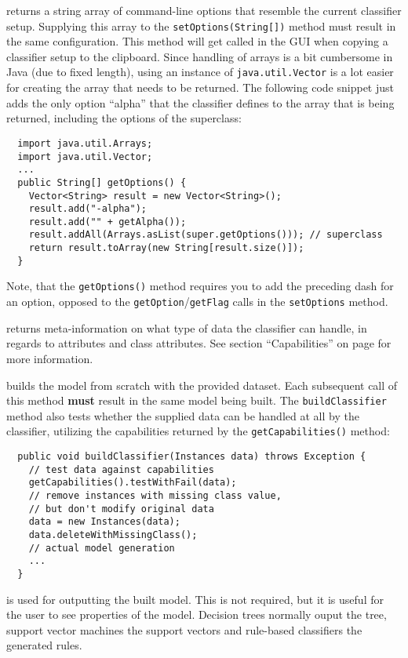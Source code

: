 returns a string array of command-line options that resemble the current
classifier setup. Supplying this array to the \texttt{setOptions(String[])}
method must result in the same configuration. This method will get called in the
GUI when copying a classifier setup to the clipboard. Since handling of arrays
is a bit cumbersome in Java (due to fixed length), using an instance of
\texttt{java.util.Vector} is a lot easier for creating the array that needs to
be returned. The following code snippet just adds the only option ``alpha'' that
the classifier defines to the array that is being returned, including the
options of the superclass:
\begin{verbatim}
  import java.util.Arrays;
  import java.util.Vector;
  ...
  public String[] getOptions() {
    Vector<String> result = new Vector<String>();
    result.add("-alpha");
    result.add("" + getAlpha());
    result.addAll(Arrays.asList(super.getOptions())); // superclass
    return result.toArray(new String[result.size()]);
  }
\end{verbatim}
Note, that the \texttt{getOptions()} method requires you to add the preceding
dash for an option, opposed to the \texttt{getOption}/\texttt{getFlag} calls in
the \texttt{setOptions} method.

returns meta-information on what type of data the classifier can handle, in
regards to attributes and class attributes. See section ``Capabilities'' on page
\pageref{classifier_capabilities} for more information.

\clearpage

builds the model from scratch with the provided dataset. Each subsequent call of
this method \textbf{must} result in the same model being built. The
\texttt{buildClassifier} method also tests whether the supplied data can be
handled at all by the classifier, utilizing the capabilities returned by the
\texttt{getCapabilities()} method:
\begin{verbatim}
  public void buildClassifier(Instances data) throws Exception {
    // test data against capabilities
    getCapabilities().testWithFail(data);
    // remove instances with missing class value,
    // but don't modify original data
    data = new Instances(data);
    data.deleteWithMissingClass();
    // actual model generation
    ...
  }
\end{verbatim}

is used for outputting the built model. This is not required, but it is useful
for the user to see properties of the model. Decision trees normally ouput the
tree, support vector machines the support vectors and rule-based classifiers the
generated rules.

